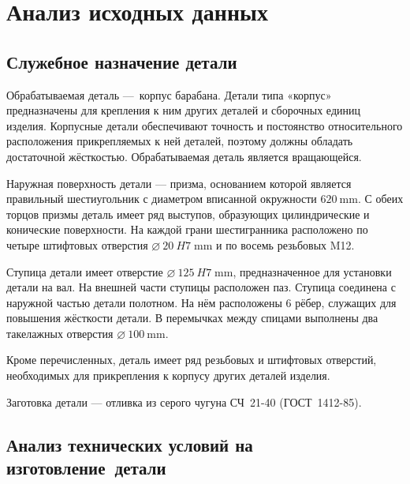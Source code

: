 \documentclass[14pt,russian,a4paper]{extreport}
\begin{document}


\setcounter{page}{3}

\tableofcontents

\chapter{Анализ исходных данных}

\section{Служебное назначение детали}

Обрабатываемая деталь --- корпус барабана. Детали типа «корпус» предназначены для крепления к ним других деталей и сборочных единиц изделия. Корпусные детали обеспечивают точность и постоянство относительного расположения прикрепляемых к ней деталей, поэтому должны обладать достаточной жёсткостью. Обрабатываемая деталь является вращающейся.\par

Наружная поверхность детали --- призма, основанием которой является правильный шестиугольник с диаметром вписанной окружности $\SI{620}{\milli\meter}$. С обеих торцов призмы деталь имеет ряд выступов, образующих цилиндрические и конические поверхности. На каждой грани шестигранника расположено по четыре штифтовых отверстия $\SI{20}[\diameter]{H7 \; \milli\meter}$ и по восемь резьбовых M12. \par

Ступица детали имеет отверстие $\SI{125}[\diameter]{H7 \; \milli\meter}$, предназначенное для ус\-тановки детали на вал. На внешней части ступицы расположен паз. Ступица соединена с наружной частью детали полотном. На нём расположены 6 рёбер, служащих для повышения жёсткости детали. В перемычках между спицами выполнены два такелажных отверстия $\SI{100}[\diameter]{\milli\meter}$.  \par

Кроме перечисленных, деталь имеет ряд резьбовых и штифтовых отверстий, необходимых для прикрепления к корпусу других деталей изделия. \par

Заготовка детали --- отливка из серого чугуна СЧ~21-40 (ГОСТ~1412-85). \par



\section{Анализ технических условий на изготовление~детали}
\end{document}
